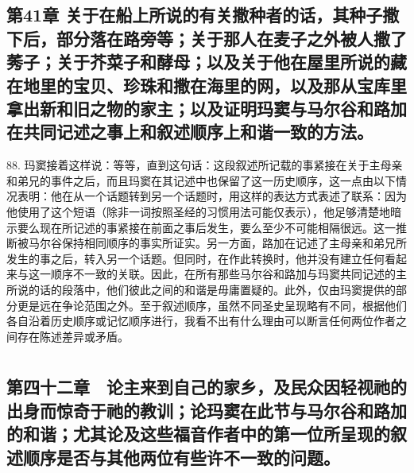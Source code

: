\subsection{第41章 关于在船上所说的有关撒种者的话，其种子撒下后，部分落在路旁等；关于那人在麦子之外被人撒了莠子；关于芥菜子和酵母；以及关于他在屋里所说的藏在地里的宝贝、珍珠和撒在海里的网，以及那从宝库里拿出新和旧之物的家主；以及证明玛窦与马尔谷和路加在共同记述之事上和叙述顺序上和谐一致的方法。}

88. 玛窦接着这样说：等等，直到这句话：这段叙述所记载的事紧接在关于主母亲和弟兄的事件之后，而且玛窦在其记述中也保留了这一历史顺序，这一点由以下情况表明：他在从一个话题转到另一个话题时，用这样的表达方式表述了联系：因为他使用了这个短语（除非一词按照圣经的习惯用法可能仅表示），他足够清楚地暗示要么现在所记述的事紧接在前面之事后发生，要么至少不可能相隔很远。这一推断被马尔谷保持相同顺序的事实所证实。另一方面，路加在记述了主母亲和弟兄所发生的事之后，转入另一个话题。但同时，在作此转换时，他并没有建立任何看起来与这一顺序不一致的关联。因此，在所有那些马尔谷和路加与玛窦共同记述的主所说的话的段落中，他们彼此之间的和谐是毋庸置疑的。此外，仅由玛窦提供的部分更是远在争论范围之外。至于叙述顺序，虽然不同圣史呈现略有不同，根据他们各自沿着历史顺序或记忆顺序进行，我看不出有什么理由可以断言任何两位作者之间存在陈述差异或矛盾。\par



\section{}


\subsection{第四十二章　论主来到自己的家乡，及民众因轻视祂的出身而惊奇于祂的教训；论玛窦在此节与马尔谷和路加的和谐；尤其论及这些福音作者中的第一位所呈现的叙述顺序是否与其他两位有些许不一致的问题。}

